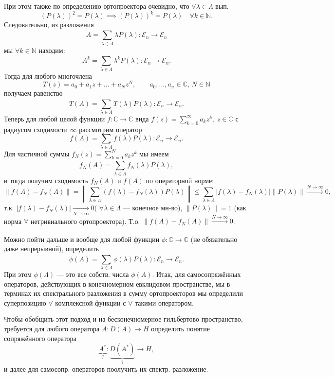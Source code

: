 \documentclass[a4paper]{article}
\begin{document}
При этом также по определению ортопроектора очевидно, что
$\forall \lambda \in \Lambda$ вып.
\[
	(P(\lambda))^2=P(\lambda)\implies
	(P(\lambda))^k =P(\lambda) \quad \forall k \in \mathbb{N}
.\] 
Следовательно, из разложения
\[
	A= \sum_{\lambda \in \Lambda}^{} \lambda P(\lambda):
	\mathcal{E}_n \to  \mathcal{E}_n
\]
мы $\forall k \in \mathbb{N}$ находим:
\[
	A^k= \sum_{\lambda \in \Lambda}^{} \lambda^k P(\lambda):
	\mathcal{E}_n \to \mathcal{E}_n
.\] 
Тогда для любого многочлена
\[
	T(z)= a_0 +a_1 z + \ldots+ a_N z^N,\qquad 
	a_0, \ldots, a_n \in \mathbb{C},\, N \in \mathbb{N}
\]
получаем равенство
\[
	T(A) = \sum_{\lambda \in \Lambda}^{} T(\lambda)
	P(\lambda): \mathcal{E}_n \to \mathcal{E}_n
.\] 
Теперь для любой целой функции $f : \mathbb{C}\to \mathbb{C}$ 
вида $f(z) = \sum_{k=0}^{\infty} a_k z^k, \; z \in \mathbb{C}$ с
радиусом сходимости $\infty$ рассмотрим оператор
\[
	f(A)= \sum_{\lambda \in \Lambda} f(\lambda)P(\lambda):
	\mathcal{E}_n\to \mathcal{E}_n
.\] 
Для частичной суммы
$f_N(z)=\sum_{k=0}^{N} a_k z^k$ мы имеем
 \[
	 f_N (A)=\sum_{\lambda \in \Lambda}^{} f_N (\lambda)
	 P(\lambda), 
\]
и тогда получим сходимость
$f_N(A)$ и $f(A)$ по операторной норме:
\[
	\| f(A) -f_N (A)\|= \left\lVert \sum_{\lambda \in \Lambda
	}^{} \left( f(\lambda) - f_N (\lambda) \right) P(\lambda)\right\rVert\le  \sum_{\lambda \in \Lambda}^{}|f(\lambda)-
f_N(\lambda)| \| P(\lambda)\|\xrightarrow[]{N\to \infty}0
,\] 
т.\:к. $|f(\lambda)-f_N(\lambda)|\xrightarrow[N\to \infty]{}0 $(
$\forall \lambda \in \Lambda$ --- конечное мн-во),
$\|P(\lambda)\|=1$ (как норма  $\forall$ нетривиального
ортопроектора).
Т.\:о. $\| f(A)-f_N(A)\|\xrightarrow[]{N\to  \infty}0$.

Можно пойти дальше и вообще для любой функции $\phi: \mathbb{C}\to 
\mathbb{C}$ (не обязательно даже непрерывной), определить
\[
	\phi(A)= \sum_{\lambda \in \Lambda}^{} \phi(\lambda)
	P(\lambda) :
	\mathcal{E}_n \to  \mathcal{E}_n
.\] 
При этом $\phi(\Lambda)$ --- это все собств. числа $\phi(A)$.
Итак, для самосопряжённых операторов, действующих в конечномерном
евклидовом пространстве, мы в терминах
их спектрального разложения в сумму ортопроекторов мы определили
суперпозицию $\forall$ комплексной функции с $\forall$ такими
оператором.

Чтобы обобщить этот подход и на бесконечномерное гильбертово пространство,
требуется для любого оператора $A: D(A)\to H$ определить понятие
сопряжённого оператора \[\underbrace{A^*}_{?}: \underbrace{D(A^*)}_{?} \to  H,\]
и далее для самосопр. операторов поолучить их спектр. разложение.
\end{document}
